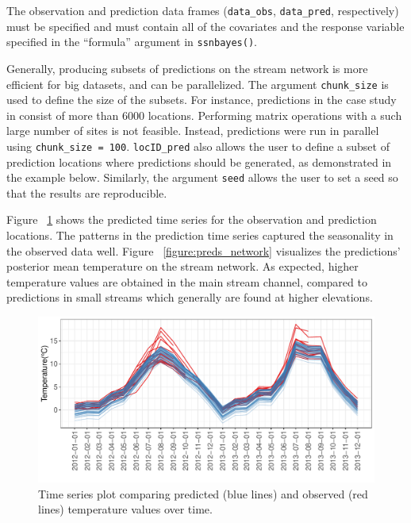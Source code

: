 \noindent The observation and prediction data frames (\texttt{data\_obs}, \texttt{data\_pred}, respectively) must be specified and must contain all of the covariates and the response variable specified in the ``formula'' argument in \texttt{ssnbayes()}. 


Generally, producing subsets of predictions on the stream network is more efficient for big datasets, and can be parallelized. The argument \texttt{chunk\_size} is used to define the size of the subsets. 
For instance, predictions in the case study in \citet{santos2022bayesian} consist of more than 6000 locations. Performing matrix operations with a such large number of sites is not feasible. 
Instead, predictions were run in parallel using \texttt{chunk\_size = 100}.   
\texttt{locID\_pred} also allows the user to define a subset of prediction locations where predictions should be generated, as demonstrated in the example below. Similarly, the argument \texttt{seed} allows the user to set a seed so that the results are reproducible.

Figure ~\ref{figure:preds_ts} shows the predicted time series for the observation and prediction locations. The patterns in the prediction time series captured the seasonality in the observed data well. 
Figure ~\ref{figure:preds_network} visualizes the predictions' posterior mean temperature on the stream network. As expected, higher temperature values are obtained in the main stream channel, compared to predictions in small streams which generally are found at higher elevations. 

\begin{figure}[htbp]
  \centering
   \includegraphics[width=5.0in]{./Figs_Pay/preds_ts.pdf}
  \caption{
  Time series plot comparing predicted (blue lines) and observed (red lines) temperature values over time. }
  \label{figure:preds_ts}
\end{figure}



